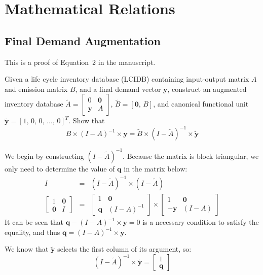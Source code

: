 \section{Mathematical Relations}

\subsection{Final Demand Augmentation}

This is a proof of Equation~2 in the manuscript.  

Given a life cycle inventory database (LCIDB) containing input-output matrix $A$ and emission matrix $B$, and a final demand vector $\mathbf{y}$, construct an augmented inventory database
$\tilde{A} = \left[\begin{smallmatrix} 0 & \mathbf{0} \\ \mathbf{y} & A \end{smallmatrix}\right]$,
$\tilde{B} = [ \mathbf{0},\, B ]$, and canonical functional unit $\tilde{\mathbf{y}} =  [ 1,\, 0,\, 0 ,\,\ldots,\, 0]^{T}$.  Show that
\begin{equation} B\times\left(I-A\right)^{-1}\times\mathbf{y} = \tilde{B}\times\left(I-\tilde{A}\right)^{-1}\times\tilde{\mathbf{y}}
\end{equation}

We begin by constructing $(I-\tilde{A})^{-1}$.  Because the matrix is block triangular, we only need to determine the value of $\mathbf{q}$ in the matrix below:
\begin{eqnarray}
  I &=&  (I-\tilde{A})^{-1}\times(I-\tilde{A})\\
  \left[\begin{array}{cc} 1 & \mathbf{0} \\
    \mathbf{0} & I
  \end{array}\right] &=&
  \left[\begin{array}{cc} 1 & \mathbf{0} \\
      \mathbf{q} & (I-A)^{-1}
  \end{array}\right]\times
  \left[\begin{array}{cc} 1 & \mathbf{0} \\
      -\mathbf{y} & (I-A)
        \end{array}\right]
\end{eqnarray}
It can be seen that $\mathbf{q}-(I-A)^{-1}\times\mathbf{y}=0$ is a necessary condition to satisfy the equality, and thus $\mathbf{q}=(I-A)^{-1}\times\mathbf{y}$.

We know that $\tilde{\mathbf{y}}$ selects the first column of its argument, so:
\begin{equation}
  (I-\tilde{A})^{-1}\times\tilde{\mathbf{y}} = \left[\begin{array}{c}
      1\\
      \mathbf{q}
    \end{array}\right]
\end{equation}

